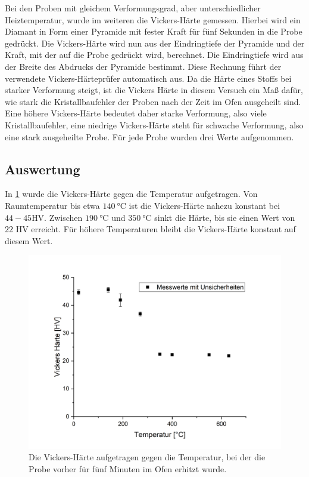 \documentclass[
	a4paper,
	12pt,
	pagesize,
	ngerman
]{scrartcl}
\begin{document}
Bei den Proben mit gleichem Verformungsgrad, aber unterschiedlicher Heiztemperatur, wurde im weiteren die Vickers-Härte gemessen. Hierbei wird ein Diamant in Form einer Pyramide mit fester Kraft für fünf Sekunden in die Probe gedrückt. Die Vickers-Härte wird nun aus der Eindringtiefe der Pyramide und der Kraft, mit der auf die Probe gedrückt wird, berechnet. Die Eindringtiefe wird aus der Breite des Abdrucks der Pyramide bestimmt. Diese Rechnung führt der verwendete Vickers-Härteprüfer automatisch aus. Da die Härte eines Stoffs bei starker Verformung steigt, ist die Vickers Härte in diesem Versuch ein Maß dafür, wie stark die Kristallbaufehler der Proben nach der Zeit im Ofen ausgeheilt sind. Eine höhere Vickers-Härte bedeutet daher starke Verformung, also viele Kristallbaufehler, eine niedrige Vickers-Härte steht für schwache Verformung, also eine stark ausgeheilte Probe. Für jede Probe wurden drei Werte aufgenommen.

\subsection{Auswertung}

In \cref{vickers} wurde die Vickers-Härte gegen die Temperatur aufgetragen. Von Raumtemperatur bis etwa $\SI{140}{\degreeCelsius}$ ist die Vickers-Härte nahezu konstant bei $44-45$HV. Zwischen $\SI{190}{\degreeCelsius}$ und $\SI{350}{\degreeCelsius}$ sinkt die Härte, bis sie einen Wert von $22$ HV erreicht. Für höhere Temperaturen bleibt die Vickers-Härte konstant auf diesem Wert.

\begin{figure}[h]
	\centering
	\includegraphics[scale=0.6]{vickers.png}
	\caption{Die Vickers-Härte aufgetragen gegen die Temperatur, bei der die Probe vorher für fünf Minuten im Ofen erhitzt wurde.}
	\label{vickers}
\end{figure}
\end{document}

